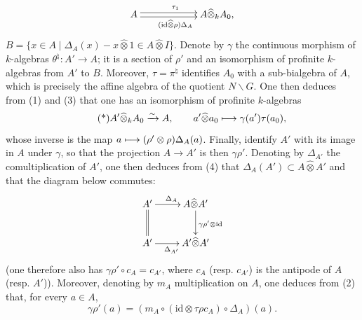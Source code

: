 \[
\xymatrix@C=58pt{A\ar@<.5ex>[r]^{\tau_1}\ar@<-.5ex>[r]_{(\mathrm{id}\widehat\otimes\rho)\Delta_A}&A\widehat\otimes_k A_0,}
\]
\ie $B=\{x\in A\mid\Delta_A(x)-x\widehat\otimes1\in A\widehat\otimes I\}$. Denote by $\gamma$ the continuous morphism of $k$-algebras $\theta^\natural:A'\to A$; it is a section of $\rho'$ and an isomorphism of profinite $k$-algebras from $A'$ to $B$. Moreover, $\tau=\pi^\natural$ identifies $A_0$ with a sub-bialgebra of $A$, which is precisely the affine algebra of the quotient $N\backslash G$. One then deduces from (1) and (3) that one has an isomorphism of profinite $k$-algebras
\begin{equation}\tag{*}
A'\widehat\otimes_k A_0\xrightarrow{\sim} A,\qquad a'\widehat\otimes a_0\longmapsto\gamma(a')\tau(a_0),
\end{equation}
whose inverse is the map $a\longmapsto(\rho'\otimes\rho)\Delta_A(a)$.
Finally, identify $A'$ with its image in $A$ under $\gamma$, so that the projection $A\to A'$ is then $\gamma\rho'$. Denoting by $\Delta_{A'}$ the comultiplication of $A'$, one then deduces from (4) that $\Delta_A(A')\subset A\widehat\otimes A'$ and that the diagram below commutes:
\[
\xymatrix{A'\ar@{=}[d]\ar[r]^{\Delta_A}&A\widehat\otimes A'\ar[d]^{\gamma\rho'\otimes\mathrm{id}}\\
A'\ar[r]_{\Delta_{A'}}&A'\widehat\otimes A'}
\]
(one therefore also has $\gamma\rho'\circ c_A=c_{A'}$, where $c_A$ (resp. $c_{A'}$) is the antipode of $A$ (resp. $A'$)). Moreover, denoting by $m_A$ multiplication on $A$, one deduces from (2) that, for every $a\in A$,
\[
\gamma\rho'(a)=(m_A\circ(\mathrm{id}\otimes\tau\rho c_A)\circ\Delta_A)(a).
\]

